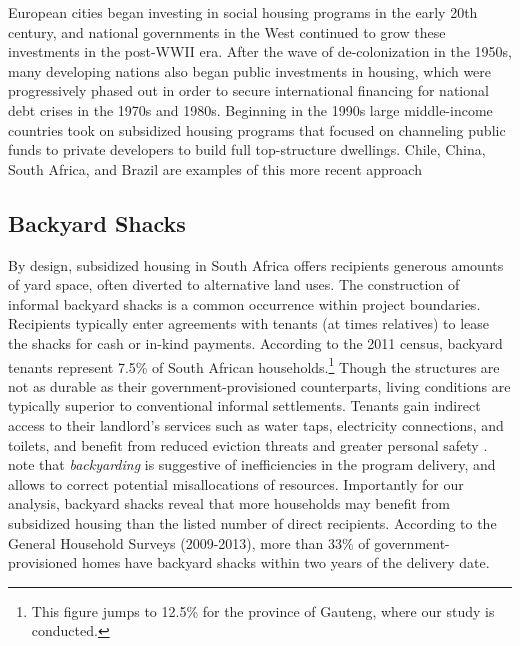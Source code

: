 \documentclass[12pt]{article}
\begin{document}
European cities began investing in social housing programs in the early 20th century, and national governments in the West continued to grow these investments in the post-WWII era. After the wave of de-colonization in the 1950s, many developing nations also began public investments in housing, which were progressively phased out in order to secure international financing for national debt crises in the 1970s and 1980s. Beginning in the 1990s large middle-income countries took on subsidized housing programs that focused on channeling public funds to private developers to build full top-structure dwellings. Chile, China, South Africa, and Brazil are examples of this more recent approach


\subsection{Backyard Shacks}

By design, subsidized housing in South Africa offers recipients generous amounts of yard space, often diverted to alternative land uses. The construction of informal backyard shacks is a common occurrence within project boundaries. Recipients typically enter agreements with tenants (at times relatives) to lease the shacks for cash or in-kind payments. According to the 2011 census, backyard tenants represent 7.5\% of South African households.\footnote{This figure jumps to 12.5\% for the province of Gauteng, where our study is conducted.} Though the structures are not as durable as their government-provisioned counterparts, living conditions are typically superior to conventional informal settlements. Tenants gain indirect access to their landlord's services such as water taps, electricity connections, and toilets, and benefit from reduced eviction threats and greater personal safety \citep{beall2003social}. \cite{Brueckner2018backyarding} note that {\it backyarding} is suggestive of inefficiencies in the program delivery, and allows to correct potential misallocations of resources. Importantly for our analysis, backyard shacks reveal that more households may benefit from subsidized housing than the listed number of direct recipients. According to the General Household Surveys (2009-2013), more than 33\% of government-provisioned homes have backyard shacks within two years of the delivery date. 

\end{document}
